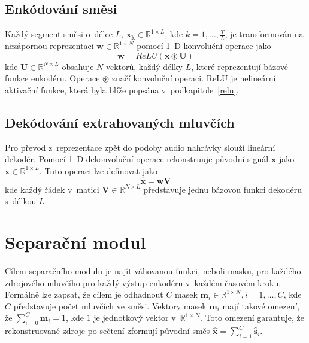 \subsection{Enkódování směsi}
Každý segment směsi o~délce $L$, $\boldsymbol{x_k} \in \mathbb{R}^{1 \times L}$, kde $k = 1, \dots, \frac{T}{L}$, je transformován na nezápornou reprezentaci $\boldsymbol{w} \in \mathbb{R}^{1 \times N}$ pomocí 1--D konvoluční operace jako
\begin{equation}
  	\boldsymbol{w} = ReLU(\boldsymbol{x} \circledast \boldsymbol{U})
\end{equation}
kde $\boldsymbol{U} \in \mathbb{R}^{N \times L}$ obsahuje $N$ vektorů, každý délky $L$, které reprezentují bázové funkce enkodéru. Operace $\circledast$ značí konvoluční operaci. ReLU je nelineární aktivační funkce, která byla blíže popsána v~podkapitole~\ref{relu}.


\subsection{Dekódování extrahovaných mluvčích}
Pro převod z~reprezentace zpět do podoby audio nahrávky slouží lineární dekodér. Pomocí 1--D dekonvoluční operace rekonstruuje původní signál $\boldsymbol{x}$ jako $\boldsymbol{x} \in \mathbb{R}^{1 \times L}$. Tuto operaci lze definovat jako 
\begin{equation}
\label{equ:decoder}
  \boldsymbol{\hat{x}} = \boldsymbol{w}\boldsymbol{V}
\end{equation}
kde každý řádek v~matici $\boldsymbol{V} \in \mathbb{R}^{N \times L}$ představuje jednu bázovou funkci dekodéru s~délkou $L$.


\section{Separační modul}
Cílem separačního modulu je najít váhovanou funkci, neboli masku, pro každého zdrojového mluvčího pro každý výstup enkodéru v~každém časovém kroku. Formálně lze zapsat, že cílem je odhadnout $C$ masek $\boldsymbol{m}_i \in \mathbb{R}^{1 \times N}, i = 1, \dots, C$, kde $C$ představuje počet mluvčích ve směsi. Vektory masek $\boldsymbol{m}_i$ mají takové omezení, že $\sum_{i=0}^{C}\boldsymbol{m}_i=1$, kde $1$ je jednotkový vektor v~$\mathbb{R}^{1 \times N}$. Toto omezení garantuje, že rekonstruované zdroje po sečtení zformují původní směs $\boldsymbol{\hat{x}} = \sum_{i=1}^{C}\boldsymbol{\hat{s}}_i$.

